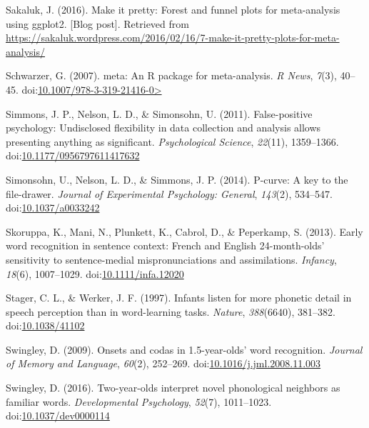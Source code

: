 \documentclass[man]{apa6}
\begin{document}
\leavevmode\hypertarget{ref-Sakaluk2016}{}%
Sakaluk, J. (2016). Make it pretty: Forest and funnel plots for meta-analysis using ggplot2. {[}Blog post{]}. Retrieved from \url{https://sakaluk.wordpress.com/2016/02/16/7-make-it-pretty-plots-for-meta-analysis/}

\leavevmode\hypertarget{ref-meta}{}%
Schwarzer, G. (2007). meta: An R package for meta-analysis. \emph{R News}, \emph{7}(3), 40--45. doi:\href{https://doi.org/10.1007/978-3-319-21416-0\%3E}{10.1007/978-3-319-21416-0\textgreater{}}

\leavevmode\hypertarget{ref-Simmons2011}{}%
Simmons, J. P., Nelson, L. D., \& Simonsohn, U. (2011). False-positive psychology: Undisclosed flexibility in data collection and analysis allows presenting anything as significant. \emph{Psychological Science}, \emph{22}(11), 1359--1366. doi:\href{https://doi.org/10.1177/0956797611417632}{10.1177/0956797611417632}

\leavevmode\hypertarget{ref-pcurve}{}%
Simonsohn, U., Nelson, L. D., \& Simmons, J. P. (2014). P-curve: A key to the file-drawer. \emph{Journal of Experimental Psychology: General}, \emph{143}(2), 534--547. doi:\href{https://doi.org/10.1037/a0033242}{10.1037/a0033242}

\leavevmode\hypertarget{ref-Skoruppa2013}{}%
Skoruppa, K., Mani, N., Plunkett, K., Cabrol, D., \& Peperkamp, S. (2013). Early word recognition in sentence context: French and English 24-month-olds' sensitivity to sentence-medial mispronunciations and assimilations. \emph{Infancy}, \emph{18}(6), 1007--1029. doi:\href{https://doi.org/10.1111/infa.12020}{10.1111/infa.12020}

\leavevmode\hypertarget{ref-Stager1997}{}%
Stager, C. L., \& Werker, J. F. (1997). Infants listen for more phonetic detail in speech perception than in word-learning tasks. \emph{Nature}, \emph{388}(6640), 381--382. doi:\href{https://doi.org/10.1038/41102}{10.1038/41102}

\leavevmode\hypertarget{ref-Swingley2009}{}%
Swingley, D. (2009). Onsets and codas in 1.5-year-olds' word recognition. \emph{Journal of Memory and Language}, \emph{60}(2), 252--269. doi:\href{https://doi.org/10.1016/j.jml.2008.11.003}{10.1016/j.jml.2008.11.003}

\leavevmode\hypertarget{ref-Swingley2016}{}%
Swingley, D. (2016). Two-year-olds interpret novel phonological neighbors as familiar words. \emph{Developmental Psychology}, \emph{52}(7), 1011--1023. doi:\href{https://doi.org/10.1037/dev0000114}{10.1037/dev0000114}
\end{document}
